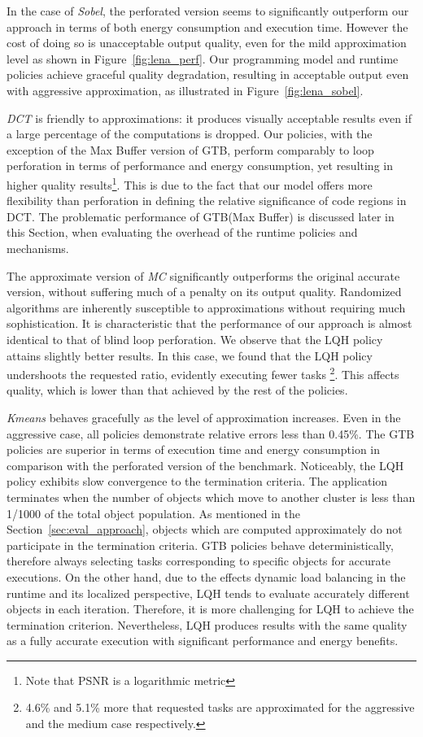 In the case of \textit{Sobel}, the perforated version seems to significantly outperform our approach in terms of both energy consumption and execution time. However the cost of doing so is unacceptable output quality, even for the mild approximation level as shown in Figure~\ref{fig:lena_perf}. Our programming model and runtime policies achieve graceful quality degradation, resulting in acceptable output even with
aggressive approximation, as illustrated in Figure~\ref{fig:lena_sobel}.

\textit{DCT} is friendly to approximations: it produces visually acceptable results even if a large percentage of the computations is dropped. Our policies, with the exception of the Max Buffer version of GTB, perform comparably to loop perforation in terms of performance and energy consumption, yet resulting in higher quality results\footnote{Note that PSNR is a logarithmic metric}. This is due to the fact that our model offers more flexibility than perforation in defining the relative significance of code regions in DCT. The problematic performance of GTB(Max Buffer) is discussed later in this Section, when evaluating the overhead of the runtime policies and mechanisms.

The approximate version of \textit{MC} significantly outperforms the original accurate version, without suffering much of a penalty on its output quality. Randomized algorithms are inherently susceptible to approximations without requiring much sophistication. It is characteristic that the performance of our approach is almost identical to that of blind loop perforation. We observe that the LQH policy attains slightly better results. In this case, we found that the LQH policy undershoots the requested ratio, evidently executing fewer tasks \footnote{4.6\% and 5.1\% more that requested tasks are approximated for the aggressive and the medium case respectively.}. This affects quality, which is lower than that achieved by the rest of the policies.

\textit{Kmeans} behaves gracefully as the level of approximation increases. Even in the aggressive case, all policies demonstrate relative errors less than 0.45\%. The GTB policies are superior in terms of 
execution time and energy consumption in comparison with the perforated version of the benchmark. 
Noticeably, the LQH policy exhibits slow convergence to the termination criteria. The application terminates when the number of objects which move to another cluster is less than 1/1000 of the total object population. As mentioned in the Section~\ref{sec:eval_approach}, objects which are computed approximately do not participate in the termination criteria. GTB policies behave deterministically, therefore always selecting tasks corresponding to specific objects for accurate executions. On the other hand, due to the effects dynamic load balancing in the runtime and its localized perspective, LQH tends to evaluate accurately different objects in each iteration. Therefore, it is more challenging for LQH to achieve the termination criterion. Nevertheless, LQH produces results with the same quality as a fully accurate execution with significant performance and energy benefits.


